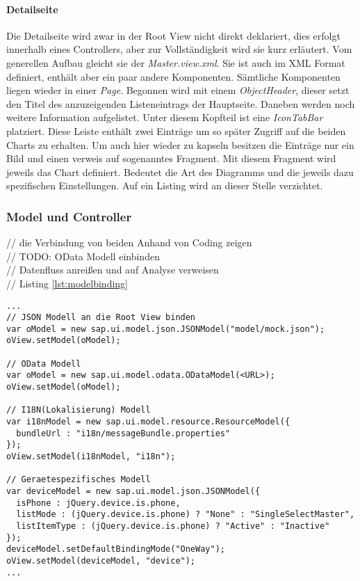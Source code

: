 \paragraph{Detailseite}$\;$ \\
Die Detailseite wird zwar in der Root View nicht direkt deklariert, dies erfolgt innerhalb eines Controllers, aber zur Vollständigkeit wird sie kurz erläutert. Vom generellen Aufbau gleicht sie der \textit{Master.view.xml}. Sie ist auch im XML Format definiert, enthält aber ein paar andere Komponenten. Sämtliche Komponenten liegen wieder in einer \textit{Page}. Begonnen wird mit einem \textit{ObjectHeader}, dieser setzt den Titel des anzuzeigenden Listeneintrags der Hauptseite. Daneben werden noch weitere Information aufgelistet. Unter diesem Kopfteil ist eine \textit{IconTabBar} platziert. Diese Leiste enthält zwei Einträge um so später Zugriff auf die beiden Charts zu erhalten. Um auch hier wieder zu kapseln besitzen die Einträge nur ein Bild und einen verweis auf sogenanntes Fragment. Mit diesem Fragment wird jeweils das Chart definiert. Bedeutet die Art des Diagramms und die jeweils dazu spezifischen Einstellungen. Auf ein Listing wird an dieser Stelle verzichtet.

\subsubsection{Model und Controller}
// die Verbindung von beiden Anhand von Coding zeigen\\
// TODO: OData Modell einbinden\\
// Datenfluss anreißen und auf Analyse verweisen\\
// Listing \ref{lst:modelbinding}
	\begin{lstlisting}[frame=htrbl, caption=Model an die Root View binden, label=lst:modelbinding]
...
// JSON Modell an die Root View binden
var oModel = new sap.ui.model.json.JSONModel("model/mock.json");
oView.setModel(oModel);

// OData Modell
var oModel = new sap.ui.model.odata.ODataModel(<URL>);
oView.setModel(oModel);

// I18N(Lokalisierung) Modell
var i18nModel = new sap.ui.model.resource.ResourceModel({
  bundleUrl : "i18n/messageBundle.properties"
});
oView.setModel(i18nModel, "i18n");

// Geraetespezifisches Modell
var deviceModel = new sap.ui.model.json.JSONModel({
  isPhone : jQuery.device.is.phone,
  listMode : (jQuery.device.is.phone) ? "None" : "SingleSelectMaster",
  listItemType : (jQuery.device.is.phone) ? "Active" : "Inactive"
});
deviceModel.setDefaultBindingMode("OneWay");
oView.setModel(deviceModel, "device");
...
	\end{lstlisting}

